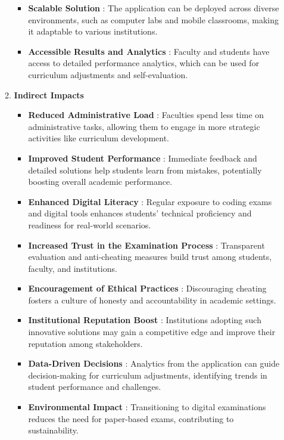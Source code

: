 \documentclass[14pt]{article}
\begin{document}
\begin{enumerate}
\begin{enumerate}
\begin{itemize}
\item \textbf{Scalable Solution} : The application can be deployed across diverse environments, such as computer labs and mobile classrooms, making it adaptable to various institutions.
\item \textbf{Accessible Results and Analytics} : Faculty and students have access to detailed performance analytics, which can be used for curriculum adjustments and self-evaluation.
\end{itemize}   
\item \textbf{Indirect Impacts}
\begin{itemize}
\item \textbf{Reduced Administrative Load} : Faculties spend less time on administrative tasks, allowing them to engage in more strategic activities like curriculum development.
\item \textbf{Improved Student Performance} : Immediate feedback and detailed solutions help students learn from mistakes, potentially boosting overall academic performance.
\item \textbf{Enhanced Digital Literacy} : Regular exposure to coding exams and digital tools enhances students' technical proficiency and readiness for real-world scenarios.
\item \textbf{Increased Trust in the Examination Process} : Transparent evaluation and anti-cheating measures build trust among students, faculty, and institutions.
\item \textbf{Encouragement of Ethical Practices} : Discouraging cheating fosters a culture of honesty and accountability in academic settings.
\item \textbf{Institutional Reputation Boost} : Institutions adopting such innovative solutions may gain a competitive edge and improve their reputation among stakeholders.
\item \textbf{Data-Driven Decisions} : Analytics from the application can guide decision-making for curriculum adjustments, identifying trends in student performance and challenges.
\item \textbf{Environmental Impact} : Transitioning to digital examinations reduces the need for paper-based exams, contributing to sustainability.
\end{itemize}
\end{enumerate}
    

\end{enumerate}
\end{document}
